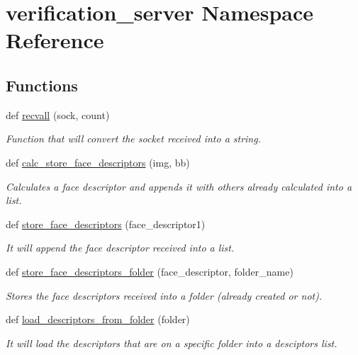 \hypertarget{namespaceverification__server}{}\section{verification\+\_\+server Namespace Reference}
\label{namespaceverification__server}
\subsection*{Functions}
\begin{DoxyCompactItemize}
\item 
def \hyperlink{namespaceverification__server_a3511e2a2145fd413ad59827fdaa08e3f}{recvall} (sock, count)
\begin{DoxyCompactList}\small\item\em Function that will convert the socket received into a string. \end{DoxyCompactList}\item 
def \hyperlink{namespaceverification__server_a1538ab2d39ce70cfce2373fe1afd932d}{calc\+\_\+store\+\_\+face\+\_\+descriptors} (img, bb)
\begin{DoxyCompactList}\small\item\em Calculates a face descriptor and appends it with others already calculated into a list. \end{DoxyCompactList}\item 
def \hyperlink{namespaceverification__server_ab767e1cd7d607d8fb77beabdd322397f}{store\+\_\+face\+\_\+descriptors} (face\+\_\+descriptor1)
\begin{DoxyCompactList}\small\item\em It will append the face descriptor received into a list. \end{DoxyCompactList}\item 
def \hyperlink{namespaceverification__server_ac0248c1ac07d115bcbf7667409a4bab9}{store\+\_\+face\+\_\+descriptors\+\_\+folder} (face\+\_\+descriptor, folder\+\_\+name)
\begin{DoxyCompactList}\small\item\em Stores the face descriptors received into a folder (already created or not). \end{DoxyCompactList}\item 
def \hyperlink{namespaceverification__server_abdd5fe10279e77d0db7f072fb9b5d5ed}{load\+\_\+descriptors\+\_\+from\+\_\+folder} (folder)
\begin{DoxyCompactList}\small\item\em It will load the descriptors that are on a specific folder into a desciptors list. \end{DoxyCompactList}\item 

\end{DoxyCompactItemize}
